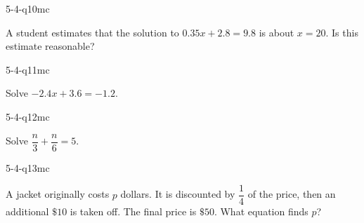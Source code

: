 \begin{practiceQuestion}{5-4-q10}{mc}
\begin{questionText}
A student estimates that the solution to $0.35x + 2.8 = 9.8$ is about $x = 20$. Is this estimate reasonable?
\end{questionText}
\end{practiceQuestion}

\begin{practiceQuestion}{5-4-q11}{mc}
\begin{questionText}
Solve $-2.4x + 3.6 = -1.2$.
\end{questionText}
\end{practiceQuestion}

\begin{practiceQuestion}{5-4-q12}{mc}
\begin{questionText}
Solve $\dfrac{n}{3} + \dfrac{n}{6} = 5$.
\end{questionText}
\end{practiceQuestion}

\begin{practiceQuestion}{5-4-q13}{mc}
\begin{questionText}
A jacket originally costs $p$ dollars. It is discounted by $\dfrac{1}{4}$ of the price, then an additional $\$10$ is taken off. The final price is $\$50$. What equation finds $p$?
\end{questionText}
\end{practiceQuestion}

